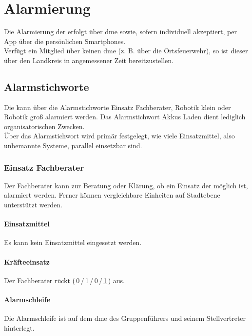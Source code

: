 \section{Alarmierung}

Die Alarmierung der \callee{} erfolgt über \ac{dme} sowie, sofern individuell akzeptiert, per App über die persönlichen Smartphones.\\

\noindent Verfügt ein Mitglied über keinen \ac{dme} (z. B. über die Ortsfeuerwehr), so ist dieser über den Landkreis in angemessener Zeit bereitzustellen.

\subsection{Alarmstichworte}

Die \callee{} kann über die Alarmstichworte \flq Einsatz Fachberater\frq{}, \flq Robotik klein\frq{} oder \flq Robotik groß\frq{} alarmiert werden. Das Alarmstichwort \flq Akkus Laden\frq{} dient lediglich organisatorischen Zwecken.\\

\noindent Über das Alarmstichwort wird primär festgelegt, wie viele Einsatzmittel, also unbemannte Systeme, parallel einsetzbar sind.

\subsubsection{Einsatz Fachberater}

Der Fachberater kann zur Beratung oder Klärung, ob ein Einsatz der \callee{} möglich ist, alarmiert werden. Ferner können vergleichbare Einheiten auf Stadtebene unterstützt werden.

\paragraph{Einsatzmittel} Es kann kein Einsatzmittel eingesetzt werden.

\paragraph{Kräfteeinsatz} Der Fachberater rückt (\,0\,/\,1\,/\,0\,/\,\underline{1}\,) aus.

\paragraph{Alarmschleife} Die Alarmschleife ist auf dem \ac{dme} des Gruppenführers und seinem Stellvertreter hinterlegt.

